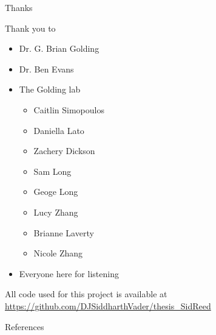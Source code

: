 \documentclass[dvipsnames]{beamer}
\newcommand{\myurl}[2][blue]{{\color{#1}\url{#2}}}
\begin{document}
\begin{frame}{Thanks}
    \begin{multicols}{2}
    \begin{minipage}[b][40ex][t]{\linewidth}
    Thank you to
    \begin{itemize}
        \item Dr. G. Brian Golding
        \item Dr. Ben Evans
        \item The Golding lab
            \begin{itemize}
                \item Caitlin Simopoulos
                \item Daniella Lato
                \item Zachery Dickson
                \item Sam Long
                \item Geoge Long
                \item Lucy Zhang
                \item Brianne Laverty
                \item Nicole Zhang
            \end{itemize}
        \item Everyone here for listening
    \end{itemize}
    \end{minipage}
    \begin{minipage}[b][20ex][t]{\linewidth}
    \begin{figure}[htb!]
    \end{figure}
    \end{minipage}
    \begin{minipage}[b][20ex][t]{\linewidth}
        \vspace{0.1in}
        All code used for this project is available at
        \myurl[blue]{https://github.com/DJSiddharthVader/thesis_SidReed}
    \end{minipage}
    \end{multicols}
\end{frame}
\begin{frame}{References}
    \printbibliography
    \addtocounter{framenumber}{-5}
\end{frame}
\end{document}
